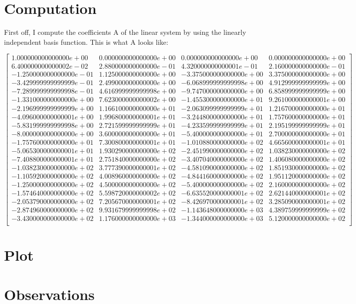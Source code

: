 \documentclass{article}
\begin{document}
\section{Computation}
First off, I compute the coefficients A of the linear system by using the linearly independent basis function. This is what A looks like:

$$
\begin{bmatrix} 
1.000000000000000e+00 & 0.000000000000000e+00 & 0.000000000000000e+00 & 0.000000000000000e+00 \\
6.400000000000002e-02 & 2.880000000000000e-01 & 4.320000000000001e-01 & 2.160000000000000e-01 \\
-1.250000000000000e-01 & 1.125000000000000e+00 & -3.375000000000000e+00 & 3.375000000000000e+00 \\
-3.429999999999999e-01 & 2.499000000000000e+00 & -6.068999999999998e+00 & 4.912999999999999e+00 \\
-7.289999999999998e-01 & 4.616999999999998e+00 & -9.747000000000000e+00 & 6.858999999999999e+00 \\
-1.331000000000000e+00 & 7.623000000000002e+00 & -1.455300000000000e+01 & 9.261000000000001e+00 \\
-2.196999999999999e+00 & 1.166100000000000e+01 & -2.063099999999999e+01 & 1.216700000000000e+01 \\
-4.096000000000001e+00 & 1.996800000000001e+01 & -3.244800000000000e+01 & 1.757600000000000e+01 \\
-5.831999999999998e+00 & 2.721599999999999e+01 & -4.233599999999999e+01 & 2.195199999999999e+01 \\
-8.000000000000000e+00 & 3.600000000000000e+01 & -5.400000000000000e+01 & 2.700000000000000e+01 \\
-1.757600000000000e+01 & 7.300800000000001e+01 & -1.010880000000000e+02 & 4.665600000000001e+01 \\
-5.065300000000001e+01 & 1.930290000000000e+02 & -2.451990000000000e+02 & 1.038230000000000e+02 \\
-7.408800000000001e+01 & 2.751840000000000e+02 & -3.407040000000000e+02 & 1.406080000000000e+02 \\
-1.038230000000000e+02 & 3.777390000000001e+02 & -4.581090000000000e+02 & 1.851930000000000e+02 \\
-1.105920000000000e+02 & 4.008960000000000e+02 & -4.844160000000000e+02 & 1.951120000000000e+02 \\
-1.250000000000000e+02 & 4.500000000000000e+02 & -5.400000000000000e+02 & 2.160000000000000e+02 \\
-1.574640000000000e+02 & 5.598720000000002e+02 & -6.635520000000001e+02 & 2.621440000000001e+02 \\
-2.053790000000000e+02 & 7.205670000000001e+02 & -8.426970000000001e+02 & 3.285090000000001e+02 \\
-2.874960000000000e+02 & 9.931679999999998e+02 & -1.143648000000000e+03 & 4.389759999999999e+02 \\
-3.430000000000000e+02 & 1.176000000000000e+03 & -1.344000000000000e+03 & 5.120000000000000e+02 \\\end{bmatrix}
$$


\section{Plot}
\section{Observations}
\end{document}
